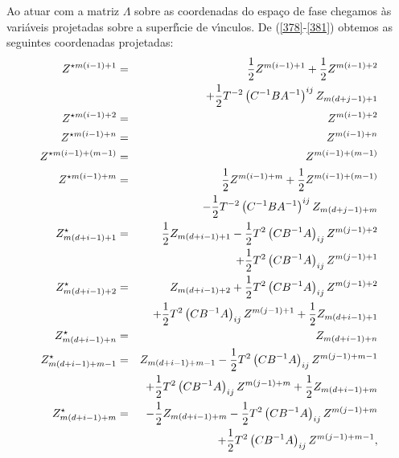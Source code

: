 \documentclass[a4paper,thmsa,12pt]{report}
\begin{document}
Ao atuar com a matriz $\Lambda $ sobre as coordenadas do espa\c{c}o de fase
chegamos \`{a}s vari\'{a}veis projetadas sobre a superf\'{\i}cie de
v\'{\i}nculos. De (\ref{378}-\ref{381}) obtemos as seguintes coordenadas
projetadas: 
\begin{eqnarray}
Z^{\star m\left( i-1\right) +1} &=&\frac{1}{2}Z^{m\left( i-1\right) +1}+%
\frac{1}{2}Z^{m\left( i-1\right) +2}  \nonumber \\
&&+\frac{1}{2}T^{-2}\left( C^{-1}BA^{-1}\right) ^{ij}Z_{m\left( d+j-1\right)
+1}  \nonumber \\
Z^{\star m\left( i-1\right) +2} &=&Z^{m\left( i-1\right) +2}  \nonumber \\
Z^{\star m\left( i-1\right) +n} &=&Z^{m\left( i-1\right) +n}  \nonumber \\
Z^{\star m\left( i-1\right) +\left( m-1\right) } &=&Z^{m\left( i-1\right)
+\left( m-1\right) }  \nonumber \\
Z^{\star m\left( i-1\right) +m} &=&\frac{1}{2}Z^{m\left( i-1\right) +m}+%
\frac{1}{2}Z^{m\left( i-1\right) +\left( m-1\right) }  \nonumber \\
&&-\frac{1}{2}T^{-2}\left( C^{-1}BA^{-1}\right) ^{ij}Z_{m\left( d+j-1\right)
+m}  \nonumber \\
Z_{m\left( d+i-1\right) +1}^{\star } &=&\frac{1}{2}Z_{m\left( d+i-1\right)
+1}-\frac{1}{2}T^{2}\left( CB^{-1}A\right) _{ij}Z^{m\left( j-1\right) +2} 
\nonumber \\
&&+\frac{1}{2}T^{2}\left( CB^{-1}A\right) _{ij}Z^{m\left( j-1\right) +1} 
\nonumber \\
Z_{m\left( d+i-1\right) +2}^{\star } &=&Z_{m\left( d+i-1\right) +2}+\frac{1}{%
2}T^{2}\left( CB^{-1}A\right) _{ij}Z^{m\left( j-1\right) +2}  \nonumber \\
&&+\frac{1}{2}T^{2}\left( CB^{-1}A\right) _{ij}Z^{m\left( j-1\right) +1}+%
\frac{1}{2}Z_{m\left( d+i-1\right) +1}  \nonumber \\
Z_{m\left( d+i-1\right) +n}^{\star } &=&Z_{m\left( d+i-1\right) +n} 
\nonumber \\
Z_{m\left( d+i-1\right) +m-1}^{\star } &=&Z_{m\left( d+i-1\right) +m-1}-%
\frac{1}{2}T^{2}\left( CB^{-1}A\right) _{ij}Z^{m\left( j-1\right) +m-1} 
\nonumber \\
&&+\frac{1}{2}T^{2}\left( CB^{-1}A\right) _{ij}Z^{m\left( j-1\right) +m}+%
\frac{1}{2}Z_{m\left( d+i-1\right) +m}  \nonumber \\
Z_{m\left( d+i-1\right) +m}^{\star } &=&-\frac{1}{2}Z_{m\left( d+i-1\right)
+m}-\frac{1}{2}T^{2}\left( CB^{-1}A\right) _{ij}Z^{m\left( j-1\right) +m} 
\nonumber \\
&&+\frac{1}{2}T^{2}\left( CB^{-1}A\right) _{ij}Z^{m\left( j-1\right) +m-1},
\label{382}
\end{eqnarray}
\end{document}
